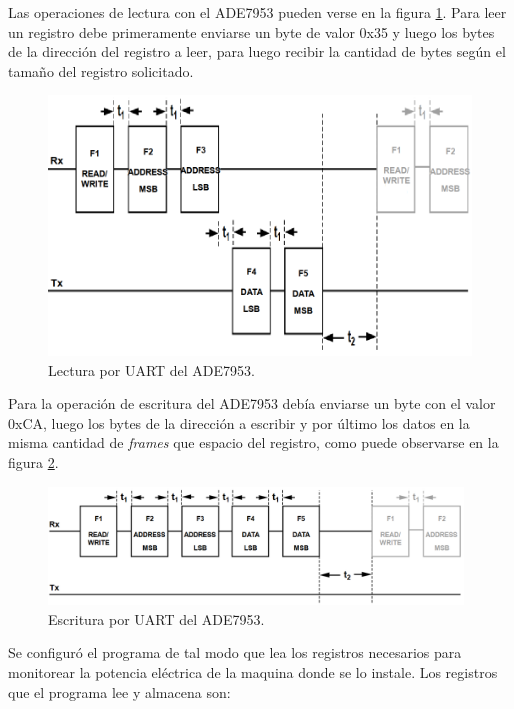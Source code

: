Las operaciones de lectura con el ADE7953 pueden verse en la figura \ref{fig:ADEread}. Para leer un registro debe primeramente enviarse un byte de valor 0x35 y luego los bytes de la dirección del registro a leer, para luego recibir la cantidad de bytes según el tamaño del registro solicitado.

\begin{figure}[htb]
	\centering
	\includegraphics[width=\textwidth , keepaspectratio]{Figures/ade7uartread.png}
	\caption{Lectura por UART del ADE7953.}
	\label{fig:ADEread}
\end{figure}

Para la operación de escritura del ADE7953 debía enviarse un byte con el valor 0xCA, luego los bytes de la dirección a escribir y por último los datos en la misma cantidad de \textit{frames} que espacio del registro, como puede observarse en la figura \ref{fig:ADEwrite}.

\begin{figure}[htb]
	\centering
	\includegraphics[width=110mm,keepaspectratio]{Figures/ade7uartwrite.png}
	\caption{Escritura por UART del ADE7953.}
	\label{fig:ADEwrite}
\end{figure}

Se configuró el programa de tal modo que lea los registros necesarios para monitorear la potencia eléctrica de la maquina donde se lo instale. Los registros que el programa lee y almacena son:

